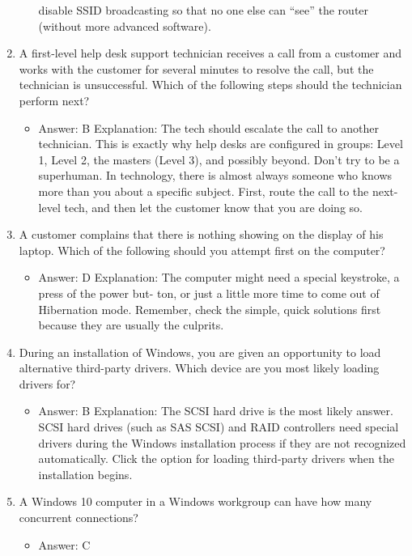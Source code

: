 \documentclass{article}
\begin{document}
\begin{enumerate}
\begin{itemize}
disable SSID broadcasting so that no one else can “see” the router (without more
advanced software).
    \end{itemize}
    \item A first-level help desk support technician receives a call from a
customer and works with the customer for several minutes to
resolve the call, but the technician is unsuccessful. Which of the
following steps should the technician perform next?
    \begin{itemize}
        \item Answer: B
Explanation: The tech should escalate the call to another technician. This is exactly
why help desks are configured in groups: Level 1, Level 2, the masters (Level 3), and
possibly beyond. Don’t try to be a superhuman. In technology, there is almost always
someone who knows more than you about a specific subject. First, route the call to the
next-level tech, and then let the customer know that you are doing so.
    \end{itemize}
    \item A customer complains that there is nothing showing on the display
of his laptop. Which of the following should you attempt first on
the computer?
    \begin{itemize}
        \item Answer: D
Explanation: The computer might need a special keystroke, a press of the power but-
ton, or just a little more time to come out of Hibernation mode. Remember, check the
simple, quick solutions first because they are usually the culprits.
    \end{itemize}
    \item During an installation of Windows, you are given an opportunity
to load alternative third-party drivers. Which device are you most
likely loading drivers for?
    \begin{itemize}
        \item Answer: B
Explanation: The SCSI hard drive is the most likely answer. SCSI hard drives (such as
SAS SCSI) and RAID controllers need special drivers during the Windows installation
process if they are not recognized automatically. Click the option for loading third-party
drivers when the installation begins.
    \end{itemize}
    \item A Windows 10 computer in a Windows workgroup can have how
many concurrent connections?
    \begin{itemize}
        \item Answer: C

\end{itemize}
\end{enumerate}
\end{document}
